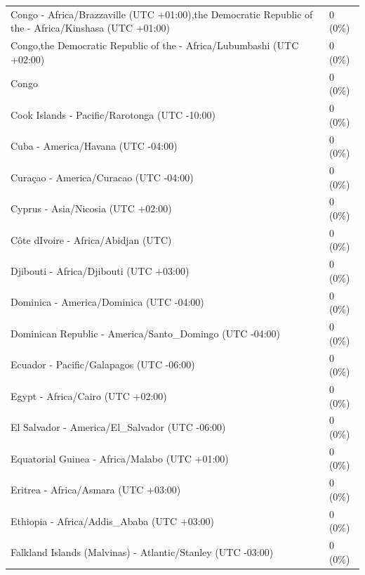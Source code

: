 \documentclass[
  english,
  man]{apa6}
\begin{document}
\begin{appendix}
\begin{table}
{\begin{tabular}[t]{ll}
\hspace{1em}Congo - Africa/Brazzaville (UTC +01:00),the Democratic Republic of the - Africa/Kinshasa (UTC +01:00) & 0 (0\%)\\
\hspace{1em}Congo,the Democratic Republic of the - Africa/Lubumbashi (UTC +02:00) & 0 (0\%)\\
\hspace{1em}Congo & 0 (0\%)\\
\addlinespace
\hspace{1em}Cook Islands - Pacific/Rarotonga (UTC -10:00) & 0 (0\%)\\
\hspace{1em}Cuba - America/Havana (UTC -04:00) & 0 (0\%)\\
\hspace{1em}Curaçao - America/Curacao (UTC -04:00) & 0 (0\%)\\
\hspace{1em}Cyprus - Asia/Nicosia (UTC +02:00) & 0 (0\%)\\
\hspace{1em}Côte dIvoire - Africa/Abidjan (UTC) & 0 (0\%)\\
\addlinespace
\hspace{1em}Djibouti - Africa/Djibouti (UTC +03:00) & 0 (0\%)\\
\hspace{1em}Dominica - America/Dominica (UTC -04:00) & 0 (0\%)\\
\hspace{1em}Dominican Republic - America/Santo\_Domingo (UTC -04:00) & 0 (0\%)\\
\hspace{1em}Ecuador - Pacific/Galapagos (UTC -06:00) & 0 (0\%)\\
\hspace{1em}Egypt - Africa/Cairo (UTC +02:00) & 0 (0\%)\\
\addlinespace
\hspace{1em}El Salvador - America/El\_Salvador (UTC -06:00) & 0 (0\%)\\
\hspace{1em}Equatorial Guinea - Africa/Malabo (UTC +01:00) & 0 (0\%)\\
\hspace{1em}Eritrea - Africa/Asmara (UTC +03:00) & 0 (0\%)\\
\hspace{1em}Ethiopia - Africa/Addis\_Ababa (UTC +03:00) & 0 (0\%)\\
\hspace{1em}Falkland Islands (Malvinas) - Atlantic/Stanley (UTC -03:00) & 0 (0\%)\\

\end{tabular}}
\end{table}
\end{appendix}
\end{document}
